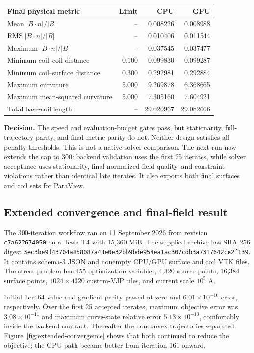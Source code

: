 \documentclass[11pt,a4paper]{article}
\newcommand{\code}[1]{\texttt{#1}}
\begin{document}
\begin{center}
\begin{tabular}{lrrr}
\toprule
Final physical metric & Limit & CPU & GPU \\
\midrule
Mean $|B\cdot n|/|B|$       & --    & 0.008226 & 0.008988 \\
RMS $|B\cdot n|/|B|$        & --    & 0.010406 & 0.011544 \\
Maximum $|B\cdot n|/|B|$    & --    & 0.037545 & 0.037477 \\
Minimum coil--coil distance & 0.100 & 0.099830 & 0.099287 \\
Minimum coil--surface distance & 0.300 & 0.292981 & 0.292884 \\
Maximum curvature           & 5.000 & 9.269878 & 6.368665 \\
Maximum mean-squared curvature & 5.000 & 7.305160 & 7.604921 \\
Total base-coil length      & --    & 29.020967 & 29.082666 \\
\bottomrule
\end{tabular}
\end{center}

\textbf{Decision.}  The speed and evaluation-budget gates pass, but stationarity,
full-trajectory parity, and final-metric parity do not.  Neither design satisfies
all penalty thresholds.  This is not a native-solver comparison.  The next run
now extends the cap to 300: backend validation uses the first 25 iterates, while
solver acceptance uses stationarity, final normalized-field quality, and
constraint violations rather than identical late iterates.  It also exports
both final surfaces and coil sets for ParaView.

\subsection{Extended convergence and final-field result}

The 300-iteration workflow ran on 11 September 2026 from revision
\code{c7a622674050} on a Tesla T4 with 15,360 MiB.  The supplied archive has
SHA-256 digest
\nolinkurl{3ec3be9f43704a858087a48e0e32bb9bde954ea1ac307cdb3a7317642ce2f139}.
It contains schema-3 JSON and nonempty CPU/GPU surface and coil VTK files.  The
stress problem has 455 optimization variables, 4,320 source points, 16,384
surface points, $1024\times4320$ custom-VJP tiles, and current scale $10^5$ A.

Initial float64 value and gradient parity passed at zero and
$6.01\times10^{-16}$ error, respectively.  Over the first 25 accepted iterates,
maximum objective error was $3.08\times10^{-11}$ and maximum curve-state
relative error $5.13\times10^{-10}$, comfortably inside the backend contract.
Thereafter the nonconvex trajectories separated.  Figure~\ref{fig:extended-convergence}
shows that both continued to reduce the objective; the GPU path became better
from iteration 161 onward.
\end{document}
